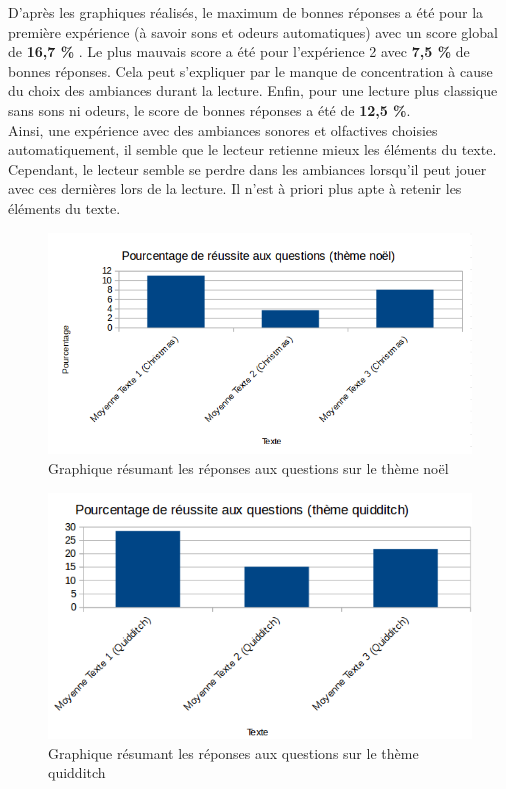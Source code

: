 \documentclass[a4paper,14pt]{report}
\begin{document}
D'après les graphiques réalisés, le maximum de bonnes réponses a été pour la première expérience (à savoir sons et odeurs automatiques) avec un score global de \textbf{16,7 \%} . Le plus mauvais score a été pour l'expérience 2 avec \textbf{7,5 \%} de bonnes réponses. Cela peut s'expliquer par le manque de concentration à cause du choix des ambiances durant la lecture. Enfin, pour une lecture plus classique sans sons ni odeurs, le score de bonnes réponses a été de \textbf{12,5 \%}. \\
Ainsi, une expérience avec des ambiances sonores et olfactives choisies automatiquement, il semble que le lecteur retienne mieux les éléments du texte. Cependant, le lecteur semble se perdre dans les ambiances lorsqu'il peut jouer avec ces dernières lors de la lecture. Il n'est à priori plus apte à retenir les éléments du texte.  



\begin{figure}[!h]

\begin{center}

\includegraphics[scale=0.5]{../Images/resultatChristmas.png}
\caption{Graphique résumant les réponses aux questions sur le thème noël}
\end{center}

\end{figure}

\begin{figure}[!h]
\begin{center}

\includegraphics[scale=0.5]{../Images/resultatsQuidditch.png}
\caption{Graphique résumant les réponses aux questions sur le thème quidditch}
\end{center}

\end{figure}
\end{document}
